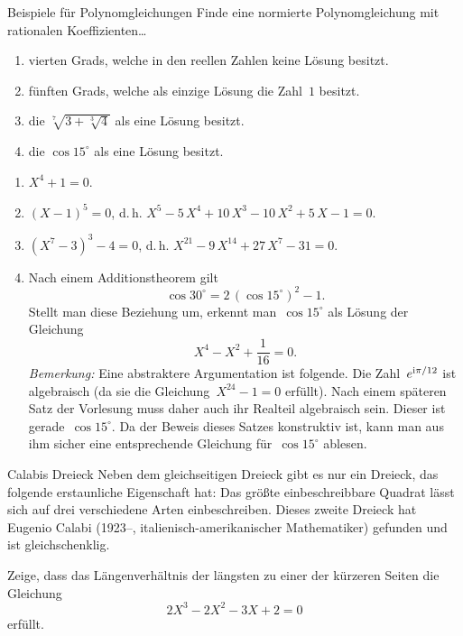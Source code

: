 \documentclass{algblatt}
\begin{document}
\begin{aufgabe}{Beispiele für Polynomgleichungen}
Finde eine normierte Polynomgleichung mit rationalen Koeffizienten\ldots
\begin{enumerate}
\item vierten Grads, welche in den reellen Zahlen keine Lösung besitzt.
\item fünften Grads, welche als einzige Lösung die Zahl~$1$ besitzt.
\item die $\sqrt[7]{3 + \sqrt[3]{4}}$ als eine Lösung besitzt.
\item die $\cos 15^\circ$ als eine Lösung besitzt.
\end{enumerate}
\begin{loesung}\begin{enumerate}
\item $X^4 + 1 = 0$.
\item $(X - 1)^5 = 0$, d.\,h. $X^5-5\,X^4+10\,X^3-10\,X^2+5\,X-1 = 0$.
\item $(X^7-3)^3-4=0$, d.\,h. $X^{21}-9\,X^{14}+27\,X^7-31 = 0$.
\item Nach einem Additionstheorem gilt
\[ \cos 30^\circ = 2 \, (\cos 15^\circ)^2 - 1. \]
Stellt man diese Beziehung um, erkennt man~$\cos 15^\circ$ als Lösung der
Gleichung
\[ X^4 - X^2 + \frac{1}{16} = 0. \]
\emph{Bemerkung:} Eine abstraktere Argumentation ist folgende.
Die Zahl~$e^{\mathrm{i} \pi / 12}$ ist algebraisch (da sie die Gleichung~$X^{24} - 1 =
0$ erfüllt). Nach einem späteren Satz der Vorlesung muss daher auch ihr Realteil
algebraisch sein. Dieser ist gerade~$\cos 15^\circ$. Da der Beweis dieses Satzes
konstruktiv ist, kann man aus ihm sicher eine entsprechende Gleichung für~$\cos
15^\circ$ ablesen.
\end{enumerate}
\end{loesung}
\end{aufgabe}

\begin{aufgabe}{Calabis Dreieck}
Neben dem gleichseitigen Dreieck gibt es nur ein Dreieck, das folgende erstaunliche
Eigenschaft hat: Das größte 
einbeschreibbare Quadrat lässt sich auf drei verschiedene Arten einbeschreiben.
Dieses zweite Dreieck hat Eugenio Calabi (1923--, italienisch-amerikanischer
Mathematiker) gefunden und ist gleichschenklig.

Zeige, dass das Längenverhältnis der längsten zu einer der kürzeren Seiten die
Gleichung
\[ 2 X^3 - 2 X^2 - 3 X + 2 = 0 \]
erfüllt. \\[1em]

\begin{center}
  \scalebox{0.5}{}
\end{center}
\end{aufgabe}
\end{document}
